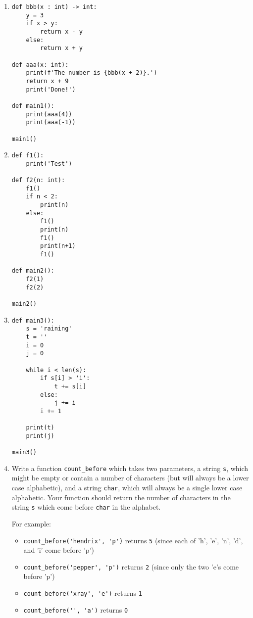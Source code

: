 \documentclass{article}
\begin{document}
\begin{enumerate}

\item \mbox{} \label{traceAAA}
\begin{verbatim}
def bbb(x : int) -> int:
    y = 3
    if x > y:
        return x - y
    else:
        return x + y

def aaa(x: int):
    print(f'The number is {bbb(x + 2)}.')
    return x + 9
    print('Done!')

def main1():
    print(aaa(4))
    print(aaa(-1))

main1()
\end{verbatim}




\newpage

\item \mbox{} \label{tracef1}
\begin{verbatim}
def f1():
    print('Test')

def f2(n: int):
    f1()
    if n < 2:
        print(n)
    else:
        f1()
        print(n)
        f1()
        print(n+1)
        f1()

def main2():
    f2(1)
    f2(2)

main2()
\end{verbatim}

\newpage
\item \mbox{} \label{traceWhile}

\begin{verbatim}
def main3():
    s = 'raining'
    t = ''
    i = 0
    j = 0

    while i < len(s):
        if s[i] > 'i':
            t += s[i]
        else:
            j += i
        i += 1

    print(t)
    print(j)

main3()
\end{verbatim}

\eject
\item Write a function \verb|count_before| which takes two parameters, a string \verb|s|, which might be empty or contain a number of characters (but will always be a lower case alphabetic), and a string \verb|char|, which will always be a single lower case alphabetic. Your function should return the number of characters in the string \verb|s| which come before \verb|char| in the alphabet.

    For example:
    \begin{itemize}
      \item \verb|count_before('hendrix', 'p')| returns \verb|5| (since each of 'h', 'e', 'n', 'd', and 'i' come before 'p')
      \item \verb|count_before('pepper', 'p')| returns \verb|2| (since only the two 'e's come before 'p')
      \item \verb|count_before('xray', 'e')| returns \verb|1|
      \item \verb|count_before('', 'a')| returns \verb|0|
    \end{itemize}


\end{enumerate}
\end{document}
